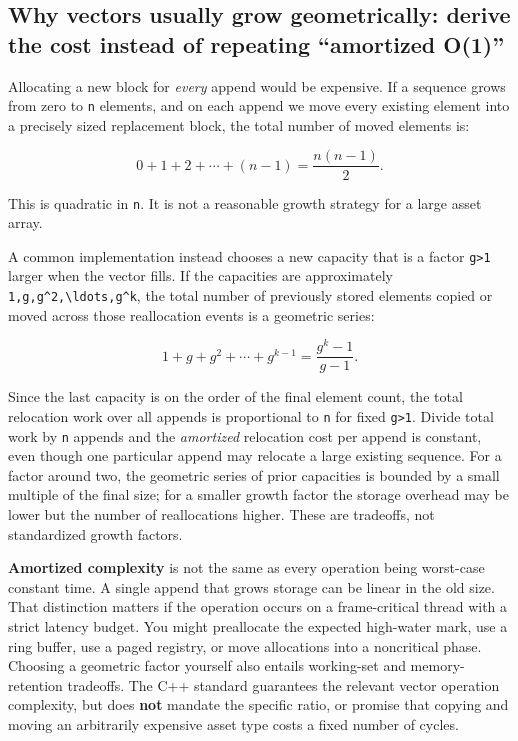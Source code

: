 \subsection{Why vectors usually grow geometrically: derive the cost instead of repeating ``amortized O(1)''}\label{01-foundations-i-ch006-why-vectors-usually-grow-geometrically-derive-the-cost-instead-of-repeating-amortized-o1}

Allocating a new block for \emph{every} append would be expensive. If a sequence grows from zero to \texttt{n} elements, and on each append we move every existing element into a precisely sized replacement block, the total number of moved elements is:

\[
0+1+2+\cdots+(n-1)=\frac{n(n-1)}{2}.
\]

This is quadratic in \texttt{n}. It is not a reasonable growth strategy for a large asset array.

A common implementation instead chooses a new capacity that is a factor \texttt{g\textgreater{}1} larger when the vector fills. If the capacities are approximately \texttt{1,g,g\^{}2,\textbackslash{}ldots,g\^{}k}, the total number of previously stored elements copied or moved across those reallocation events is a geometric series:

\[
1+g+g^2+\cdots+g^{k-1}
=\frac{g^k-1}{g-1}.
\]

Since the last capacity is on the order of the final element count, the total relocation work over all appends is proportional to \texttt{n} for fixed \texttt{g\textgreater{}1}. Divide total work by \texttt{n} appends and the \emph{amortized} relocation cost per append is constant, even though one particular append may relocate a large existing sequence. For a factor around two, the geometric series of prior capacities is bounded by a small multiple of the final size; for a smaller growth factor the storage overhead may be lower but the number of reallocations higher. These are tradeoffs, not standardized growth factors.

\textbf{Amortized complexity} is not the same as every operation being worst-case constant time. A single append that grows storage can be linear in the old size. That distinction matters if the operation occurs on a frame-critical thread with a strict latency budget. You might preallocate the expected high-water mark, use a ring buffer, use a paged registry, or move allocations into a noncritical phase. Choosing a geometric factor yourself also entails working-set and memory-retention tradeoffs. The C++ standard guarantees the relevant vector operation complexity, but does \textbf{not} mandate the specific ratio, or promise that copying and moving an arbitrarily expensive asset type costs a fixed number of cycles.

